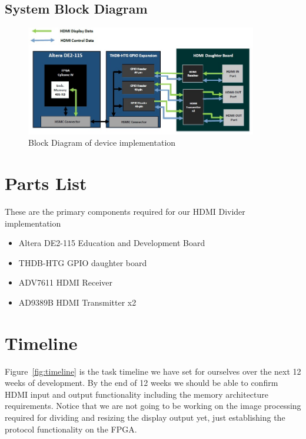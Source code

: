 \documentclass[12pt]{article}
\begin{document}
\pagebreak

\subsection{System Block Diagram}

\begin{figure}[H]
\centering
\includegraphics[width=0.9\textwidth]{Block_Diagram_v2.jpg}
\caption{Block Diagram of device implementation}
\label{fig:block}
\end{figure}

\pagebreak

\section{Parts List}

These are the primary components required for our HDMI Divider implementation

\begin{itemize}
\item Altera DE2-115 Education and Development Board \cite{Ref_DE2}
\item THDB-HTG GPIO daughter board \cite{Ref_GPIO_daughter}
\item ADV7611 HDMI Receiver \cite{Ref_HDMI_Rx}
\item AD9389B HDMI Transmitter x2 \cite{Ref_HDMI_Tx}
\end{itemize}

\section{Timeline}

Figure~\ref{fig:timeline} is the task timeline we have set for ourselves over the next 12 weeks of development. By the end of 12 weeks we should be able to confirm HDMI input and output functionality including the memory architecture requirements. Notice that we are not going to be working on the image processing required for dividing and resizing the display output yet, just establishing the protocol functionality on the FPGA.
\end{document}
